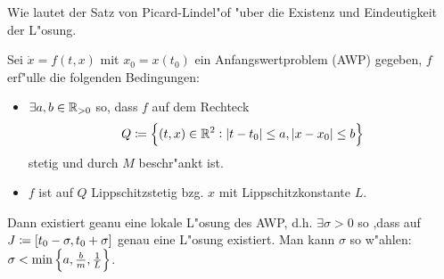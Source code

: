 \documentclass[9pt]{article}
\newcommand{\R}[1]{%
	\ifthenelse{\equal{#1}{}}
	{\mathbb{R}}
	{\mathbb{R}^{#1}}}%
\newenvironment{field}{}{\newpage}
\newif\ifnote
\newenvironment{note}{\notetrue}{\notefalse}
\newcommand{\localtag}{}
\newcommand{\globaltag}{}
\newcommand{\uuid}{}
\newcommand{\tags}[1]{
    \ifnote 
        \renewcommand{\localtag}{#1}
    \else
        \renewcommand{\globaltag}{#1}
    \fi 
    }
\newcommand{\xplain}[1]{\renewcommand{\uuid}{#1}}
\begin{document}
\begin{note}
	\xplain{3cee940e-fb01-403a-a7b9-f98f1aac3aa7}
	\tags{satz, picard-lindeloef, 3.4.2}
	
	\begin{field}  %
		Wie lautet der Satz von Picard-Lindel"of "uber die Existenz und Eindeutigkeit der L"osung.
	\end{field}
	
	\begin{field}  %
		Sei $\dot{x} = f(t,x)$ mit $x_0= x(t_0)$ ein Anfangswertproblem (AWP) gegeben, $f$ erf"ulle die folgenden Bedingungen:
		\begin{itemize}
			\item $\exists a,b \in \R{}_{>0}$ so, dass $f$ auf dem Rechteck
			\begin{equation*}
				Q\coloneqq \qty{(t,x) \in \R{2}: \abs{t-t_0} \leq a, \abs{x-x_0} \leq b}
			\end{equation*}
			stetig und durch $M$ beschr"ankt ist. 
			\item $f$ ist auf $Q$ Lippschitzstetig bzg. $x$ mit Lippschitzkonstante $L$. 
		\end{itemize}
		Dann existiert geanu eine lokale L"osung des AWP, d.h. $\exists \sigma>0$ so ,dass auf
			$J\coloneqq \qty[t_0 - \sigma, t_0 + \sigma]$  genau eine L"osung existiert. Man kann $\sigma$ so w"ahlen: $\sigma < \min\qty{a, \frac{b}{m}, \frac{1}{L}}$.
	\end{field}
\end{note}
\end{document}
